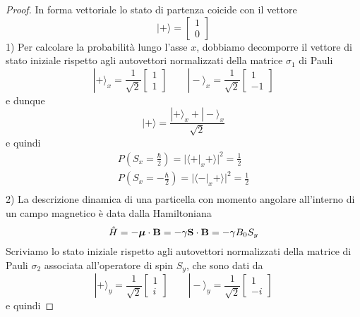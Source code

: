 \begin{proof}
	
	In forma vettoriale lo stato di partenza coicide con il vettore
	\begin{equation*}
		|+ \rangle = \left [ \begin{array}{c}
			1 \\ 0 
		\end{array} \right ] 
	\end{equation*}
1) Per calcolare la probabilit\`a lungo l'asse $x$, dobbiamo decomporre il vettore di stato iniziale rispetto agli autovettori normalizzati della matrice $\sigma_1$ di Pauli
\begin{equation*}
	|+ \rangle_x = \frac{1}{\sqrt{2}} \left [ \begin{array}{c}
		1 \\ 1
	\end{array} \right ] \quad \quad |- \rangle_x = \frac{1}{\sqrt{2}} \left [ \begin{array}{c}
		1 \\ -1
	\end{array} \right ]
\end{equation*}
e dunque 
\begin{equation*}
	|+ \rangle  = \frac{|+ \rangle_x + |- \rangle_x}{\sqrt{2}}
\end{equation*}
e quindi
\begin{align*}
	P\left (S_x = \frac{\hbar}{2} \right ) = |\langle + |_x+\rangle|^2 = \frac{1}{2}\\[0.3cm]
	P\left (S_x = -\frac{\hbar}{2} \right ) = |\langle - |_x+\rangle|^2 = \frac{1}{2}\\[0.3cm] 
\end{align*}
2) La descrizione dinamica di una particella con momento angolare all'interno di un campo magnetico \`e data dalla Hamiltoniana
\begin{equation*}
	\hat{H} = - \boldsymbol{\mu} \cdot \bold{B} = - \gamma \bold{S} \cdot \bold{B} = -\gamma B_0S_y 
\end{equation*}
Scriviamo lo stato iniziale rispetto agli autovettori normalizzati della matrice di Pauli $\sigma_2$ associata all'operatore di spin $S_y$, che sono dati da 
\begin{equation*}
	|+ \rangle_y = \frac{1}{\sqrt{2}} \left [ \begin{array}{c}
		1 \\ i
	\end{array} \right ] \quad \quad |- \rangle_y = \frac{1}{\sqrt{2}} \left [ \begin{array}{c}
		1 \\ -i
	\end{array} \right ]
\end{equation*}
e quindi 
\newpage 


\end{proof}
